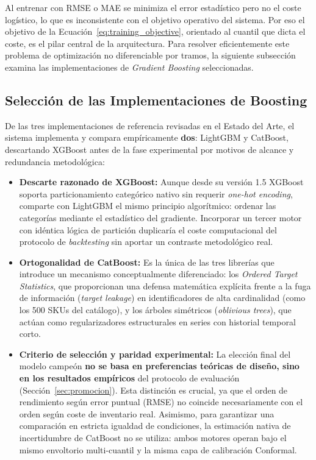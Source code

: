 Al entrenar con RMSE o MAE se minimiza el error estadístico pero no el coste logístico, lo que es inconsistente con el objetivo operativo del sistema. Por eso el objetivo de la Ecuación~\ref{eq:training_objective}, orientado al cuantil que dicta el coste, es el pilar central de la arquitectura. Para resolver eficientemente este problema de optimización no diferenciable por tramos, la siguiente subsección examina las implementaciones de \textit{Gradient Boosting} seleccionadas.

\subsection{Selección de las Implementaciones de Boosting}
\label{sec:eleccion_backends}

De las tres implementaciones de referencia revisadas en el Estado del Arte, el sistema implementa y compara empíricamente \textbf{dos}: LightGBM y CatBoost, descartando XGBoost antes de la fase experimental por motivos de alcance y redundancia metodológica:

\begin{itemize}
    \item \textbf{Descarte razonado de XGBoost:} Aunque desde su versión 1.5 XGBoost soporta particionamiento categórico nativo sin requerir \textit{one-hot encoding}, comparte con LightGBM el mismo principio algorítmico: ordenar las categorías mediante el estadístico del gradiente. Incorporar un tercer motor con idéntica lógica de partición duplicaría el coste computacional del protocolo de \textit{backtesting} sin aportar un contraste metodológico real.
    \item \textbf{Ortogonalidad de CatBoost:} Es la única de las tres librerías que introduce un mecanismo conceptualmente diferenciado: los \textit{Ordered Target Statistics}, que proporcionan una defensa matemática explícita frente a la fuga de información (\textit{target leakage}) en identificadores de alta cardinalidad (como los 500 SKUs del catálogo), y los árboles simétricos (\textit{oblivious trees}), que actúan como regularizadores estructurales en series con historial temporal corto.
    \item \textbf{Criterio de selección y paridad experimental:} La elección final del modelo campeón \textbf{no se basa en preferencias teóricas de diseño, sino en los resultados empíricos} del protocolo de evaluación (Sección~\ref{sec:promocion}). Esta distinción es crucial, ya que el orden de rendimiento según error puntual (RMSE) no coincide necesariamente con el orden según coste de inventario real. Asimismo, para garantizar una comparación en estricta igualdad de condiciones, la estimación nativa de incertidumbre de CatBoost no se utiliza: ambos motores operan bajo el mismo envoltorio multi-cuantil y la misma capa de calibración Conformal.
\end{itemize}

